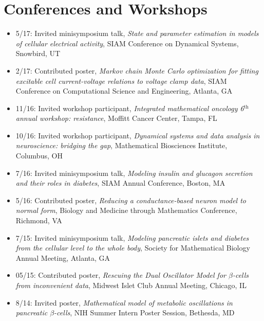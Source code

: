 \documentclass[11pt]{cv}
\begin{document}
\section*{Conferences and Workshops}
\label{sec:orgheadline11}
\begin{itemize}
\item 5/17: Invited minisymposium talk, \emph{State and parameter estimation in models of cellular electrical activity}, SIAM Conference on Dynamical Systems, Snowbird, UT\\
\item 2/17: Contributed poster, \emph{Markov chain Monte Carlo optimization for fitting excitable cell current-voltage relations to voltage clamp data}, SIAM Conference on Computational Science and Engineering, Atlanta, GA\\
\item 11/16: Invited workshop participant, \emph{Integrated mathematical oncology 6\(^{\text{th}}\) annual workshop: resistance}, Moffitt Cancer Center, Tampa, FL\\
\item 10/16: Invited workshop participant, \emph{Dynamical systems and data analysis in neuroscience: bridging the gap}, Mathematical Biosciences Institute, Columbus, OH\\
\item 7/16: Invited minisymposium talk, \emph{Modeling insulin and glucagon secretion and their roles in diabetes}, SIAM Annual Conference, Boston, MA\\
\item 5/16: Contributed poster, \emph{Reducing a conductance-based neuron model to normal form}, Biology and Medicine through Mathematics Conference, Richmond, VA\\
\item 7/15: Invited minisymposium talk, \emph{Modeling pancreatic islets and diabetes from the cellular level to the whole body}, Society for Mathematical Biology Annual Meeting, Atlanta, GA\\
\item 05/15: Contributed poster, \emph{Rescuing the Dual Oscillator Model for \(\beta\)-cells from inconvenient data}, Midwest Islet Club Annual Meeting, Chicago, IL\\
\item 8/14: Invited poster, \emph{Mathematical model of metabolic oscillations in pancreatic \(\beta\)-cells}, NIH Summer Intern Poster Session, Bethesda, MD\\
\end{itemize}
\end{document}
